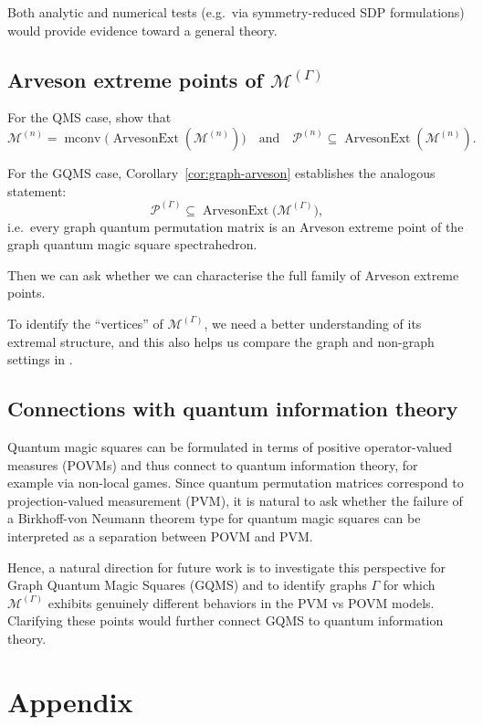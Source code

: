 \documentclass[11pt, a4paper]{article}
\theoremstyle{plain}
\theoremstyle{definition}
\theoremstyle{remark}
\begin{document}
Both analytic and numerical tests (e.g.\ via symmetry-reduced SDP
formulations) would provide evidence toward a general theory.


\subsection{Arveson extreme points of \(\mathcal M^{(\Gamma)}\)}

For the QMS case, \cites{DDN20, EH19} show that
\[
\mathcal M^{(n)} 
= \operatorname{mconv}\big(\operatorname{ArvesonExt}(\mathcal M^{(n)})\big)
\quad\text{and}\quad
\mathcal P^{(n)} \subseteq \operatorname{ArvesonExt}(\mathcal M^{(n)}).
\]

For the GQMS case, Corollary~\ref{cor:graph-arveson} establishes the
analogous statement:
\[
\mathcal P^{(\Gamma)} \subseteq \operatorname{ArvesonExt}\big(\mathcal M^{(\Gamma)}\big),
\]
i.e.\ every graph quantum permutation matrix is an Arveson extreme point
of the graph quantum magic square spectrahedron.

Then we can ask whether we can characterise the full family of Arveson extreme points.

To identify the ``vertices'' of \(\mathcal M^{(\Gamma)}\), we need a better understanding of its extremal structure, and this also helps us compare the graph and non-graph settings in \cite{DDN20}.


\subsection{Connections with quantum information theory}

Quantum magic squares can be formulated in terms of positive operator-valued measures (POVMs) and thus connect to quantum information theory, for example via non-local games.
Since quantum permutation matrices correspond to projection-valued measurement (PVM), it is natural to ask whether the failure of a Birkhoff-von Neumann theorem type for quantum magic squares can be interpreted as a separation between POVM and PVM.

Hence, a natural direction for future work is to investigate this perspective for Graph Quantum Magic Squares (GQMS) and to identify graphs \(\Gamma\) for which \(\mathcal M^{(\Gamma)}\) exhibits genuinely different behaviors in the PVM vs POVM models. Clarifying these points would further connect GQMS to quantum information theory.


\appendix
\section{Appendix}
\end{document}
